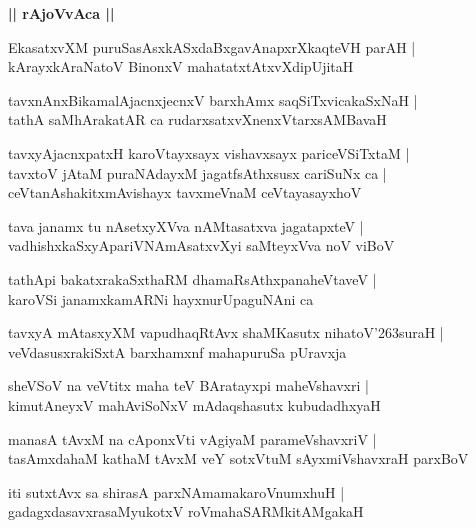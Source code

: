 \documentclass[twoside,12pt,openright]{book}
\def\S{\char'263}
\newcounter{shloka}[chapter]
\def\uvaca#1{\centerline{{\large\textbf{#1}}}}
\begin{document}
\uvaca{|| rAjoVvAca ||}

\begin{shloka}%
EkasatxvXM puruSasAsxkASxdaBxgavAnapxrXkaqteVH parAH |\\
kArayxkAraNatoV BinonxV mahatatxtAtxvXdipUjitaH
\end{shloka}

\begin{shloka}%
tavxnAnxBikamalAjacnxjecnxV barxhAmx saqSiTxvicakaSxNaH |\\
tathA saMhArakatAR ca rudarxsatxvXnenxVtarxsAMBavaH
\end{shloka}

\begin{shloka}%
tavxyAjacnxpatxH karoVtayxsayx vishavxsayx pariceVSiTxtaM |\\
tavxtoV jAtaM puraNAdayxM jagatfsAthxsusx cariSuNx ca |\\
ceVtanAshakitxmAvishayx tavxmeVnaM ceVtayasayxhoV
\end{shloka}

\begin{shloka}%
tava janamx tu nAsetxyXVva nAMtasatxva jagatapxteV |\\
vadhishxkaSxyApariVNAmAsatxvXyi saMteyxVva noV viBoV
\end{shloka}

\begin{shloka}%
tathApi bakatxrakaSxthaRM dhamaRsAthxpanaheVtaveV |\\
karoVSi janamxkamARNi hayxnurUpaguNAni ca 
\end{shloka}

\begin{shloka}%
tavxyA mAtasxyXM vapudhaqRtAvx shaMKasutx nihatoV\S suraH |\\
veVdasusxrakiSxtA barxhamxnf mahapuruSa pUravxja
\end{shloka}

\begin{shloka}%
sheVSoV na veVtitx maha teV BAratayxpi maheVshavxri |\\
kimutAneyxV mahAviSoNxV mAdaqshasutx kubudadhxyaH 
\end{shloka}

\begin{shloka}%
manasA tAvxM na cAponxVti vAgiyaM parameVshavxriV |\\
tasAmxdahaM kathaM tAvxM veY sotxVtuM sAyxmiVshavxraH parxBoV 
\end{shloka}

\begin{shloka}%
iti sutxtAvx sa shirasA parxNAmamakaroVnumxhuH |\\
gadagxdasavxrasaMyukotxV roVmahaSARMkitAMgakaH 
\end{shloka}
\end{document}
